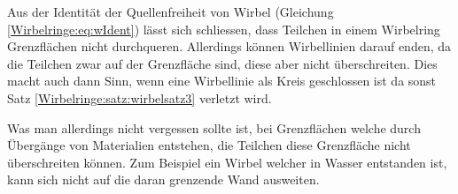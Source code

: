 Aus der Identität der Quellenfreiheit von Wirbel (Gleichung \eqref{Wirbelringe:eq:wIdent}) lässt sich schliessen, dass Teilchen in einem Wirbelring Grenzflächen nicht durchqueren.
Allerdings können Wirbellinien darauf enden, da die Teilchen zwar auf der Grenzfläche sind, diese aber nicht überschreiten.
Dies macht auch dann Sinn, wenn eine Wirbellinie als Kreis geschlossen ist da sonst Satz \ref{Wirbelringe:satz:wirbelsatz3} verletzt wird.

Was man allerdings nicht vergessen sollte ist, bei Grenzflächen welche durch Übergänge von Materialien entstehen, die Teilchen diese Grenzfläche nicht überschreiten können.
Zum Beispiel ein Wirbel welcher in Wasser entstanden ist, kann sich nicht auf die daran grenzende Wand ausweiten.
